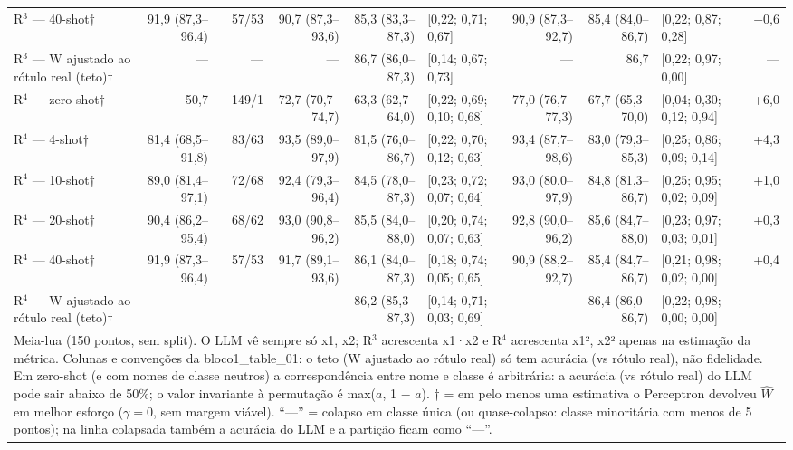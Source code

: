 \begin{table}[htbp]
\begin{tabular}{lrrrrlrrlr}
R$^3$ — 40-shot† & 91,9 (87,3–96,4) & 57/53 & 90,7 (87,3–93,6) & 85,3 (83,3–87,3) & [0,22; 0,71; 0,67] & 90,9 (87,3–92,7) & 85,4 (84,0–86,7) & [0,22; 0,87; 0,28] & $-$0,6 \\
R$^3$ — W ajustado ao rótulo real (teto)† & — & — & — & 86,7 (86,0–87,3) & [0,14; 0,67; 0,73] & — & 86,7 & [0,22; 0,97; 0,00] & — \\
\midrule
R$^4$ — zero-shot† & 50,7 & 149/1 & 72,7 (70,7–74,7) & 63,3 (62,7–64,0) & [0,22; 0,69; 0,10; 0,68] & 77,0 (76,7–77,3) & 67,7 (65,3–70,0) & [0,04; 0,30; 0,12; 0,94] & +6,0 \\
R$^4$ — 4-shot† & 81,4 (68,5–91,8) & 83/63 & 93,5 (89,0–97,9) & 81,5 (76,0–86,7) & [0,22; 0,70; 0,12; 0,63] & 93,4 (87,7–98,6) & 83,0 (79,3–85,3) & [0,25; 0,86; 0,09; 0,14] & +4,3 \\
R$^4$ — 10-shot† & 89,0 (81,4–97,1) & 72/68 & 92,4 (79,3–96,4) & 84,5 (78,0–87,3) & [0,23; 0,72; 0,07; 0,64] & 93,0 (80,0–97,9) & 84,8 (81,3–86,7) & [0,25; 0,95; 0,02; 0,09] & +1,0 \\
R$^4$ — 20-shot† & 90,4 (86,2–95,4) & 68/62 & 93,0 (90,8–96,2) & 85,5 (84,0–88,0) & [0,20; 0,74; 0,07; 0,63] & 92,8 (90,0–96,2) & 85,6 (84,7–88,0) & [0,23; 0,97; 0,03; 0,01] & +0,3 \\
R$^4$ — 40-shot† & 91,9 (87,3–96,4) & 57/53 & 91,7 (89,1–93,6) & 86,1 (84,0–87,3) & [0,18; 0,74; 0,05; 0,65] & 90,9 (88,2–92,7) & 85,4 (84,7–86,7) & [0,21; 0,98; 0,02; 0,00] & +0,4 \\
R$^4$ — W ajustado ao rótulo real (teto)† & — & — & — & 86,2 (85,3–87,3) & [0,14; 0,71; 0,03; 0,69] & — & 86,4 (86,0–86,7) & [0,22; 0,98; 0,00; 0,00] & — \\
\bottomrule
\multicolumn{10}{p{0.95\linewidth}}{\footnotesize Meia-lua (150 pontos, sem split). O LLM vê sempre só x1, x2; R$^3$ acrescenta x1·x2 e R$^4$ acrescenta x1², x2² apenas na estimação da métrica. Colunas e convenções da bloco1\_table\_01: o teto (W ajustado ao rótulo real) só tem acurácia (vs rótulo real), não fidelidade. Em zero-shot (e com nomes de classe neutros) a correspondência entre nome e classe é arbitrária: a acurácia (vs rótulo real) do LLM pode sair abaixo de 50\%; o valor invariante à permutação é max($a$, 1 $-$ $a$). † = em pelo menos uma estimativa o Perceptron devolveu $\hat{W}$ em melhor esforço ($\gamma = 0$, sem margem viável). ``—'' = colapso em classe única (ou quase-colapso: classe minoritária com menos de 5 pontos); na linha colapsada também a acurácia do LLM e a partição ficam como ``—''.} \\
\end{tabular}
\end{table}
